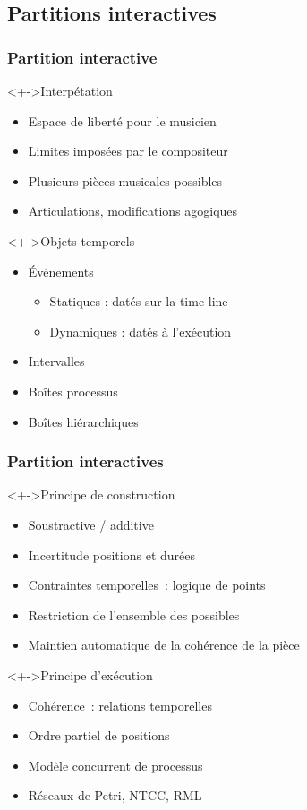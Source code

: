\subsection{Partitions interactives}
\begin{frame}
	\frametitle{Partition interactive}
	\begin{block}<+->{Interpétation}
		\begin{itemize}
			\item Espace de liberté pour le musicien
			\item Limites imposées par le compositeur
			\item Plusieurs pièces musicales possibles
			\item Articulations, modifications agogiques
		\end{itemize}
	\end{block}
	
	\begin{block}<+->{Objets temporels}
		\begin{itemize}
			\item Événements
			\begin{itemize}
				\item Statiques : datés sur la time-line
				\item Dynamiques : datés à l'exécution
			\end{itemize}
			\item Intervalles
			\item Boîtes processus
			\item Boîtes hiérarchiques
		\end{itemize}
	\end{block}
\end{frame}

\begin{frame}
	\frametitle{Partition interactives}
	\begin{block}<+->{Principe de construction}
		\begin{itemize}
			\item Soustractive / additive
			\item Incertitude positions et durées
			\item Contraintes temporelles~: logique de points
			\item Restriction de l'ensemble des possibles
			\item Maintien automatique de la cohérence de la pièce
		\end{itemize}
	\end{block}
	
	\begin{block}<+->{Principe d'exécution}
		\begin{itemize}
			\item Cohérence~: relations temporelles
			\item Ordre partiel de positions
			\item Modèle concurrent de processus
			\item Réseaux de Petri, NTCC, RML
		\end{itemize}
	\end{block}
\end{frame}

